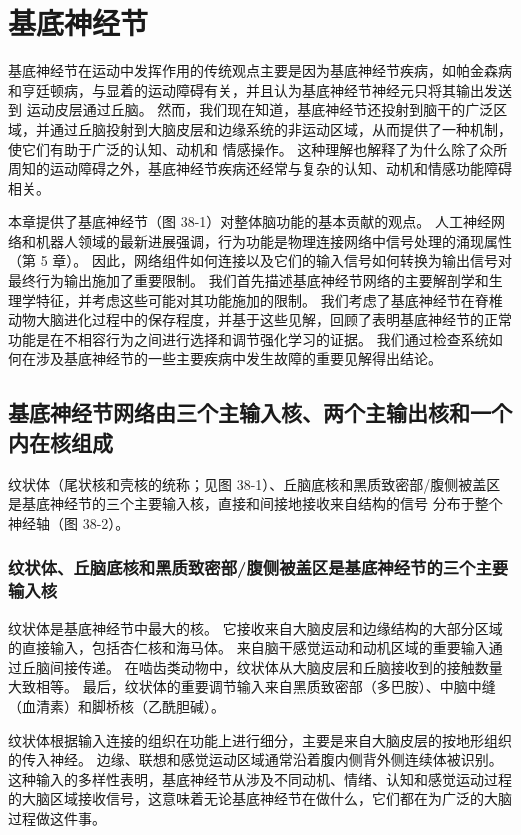 \chapter{基底神经节}

基底神经节在运动中发挥作用的传统观点主要是因为基底神经节疾病，如帕金森病和亨廷顿病，与显着的运动障碍有关，并且认为基底神经节神经元只将其输出发送到 运动皮层通过丘脑。 然而，我们现在知道，基底神经节还投射到脑干的广泛区域，并通过丘脑投射到大脑皮层和边缘系统的非运动区域，从而提供了一种机制，使它们有助于广泛的认知、动机和 情感操作。 这种理解也解释了为什么除了众所周知的运动障碍之外，基底神经节疾病还经常与复杂的认知、动机和情感功能障碍相关。

本章提供了基底神经节（图 38-1）对整体脑功能的基本贡献的观点。 人工神经网络和机器人领域的最新进展强调，行为功能是物理连接网络中信号处理的涌现属性（第 5 章）。 因此，网络组件如何连接以及它们的输入信号如何转换为输出信号对最终行为输出施加了重要限制。 我们首先描述基底神经节网络的主要解剖学和生理学特征，并考虑这些可能对其功能施加的限制。 我们考虑了基底神经节在脊椎动物大脑进化过程中的保存程度，并基于这些见解，回顾了表明基底神经节的正常功能是在不相容行为之间进行选择和调节强化学习的证据。 我们通过检查系统如何在涉及基底神经节的一些主要疾病中发生故障的重要见解得出结论。

\section{基底神经节网络由三个主输入核、两个主输出核和一个内在核组成}
纹状体（尾状核和壳核的统称；见图 38-1）、丘脑底核和黑质致密部/腹侧被盖区是基底神经节的三个主要输入核，直接和间接地接收来自结构的信号 分布于整个神经轴（图 38-2）。

\subsection{纹状体、丘脑底核和黑质致密部/腹侧被盖区是基底神经节的三个主要输入核}
纹状体是基底神经节中最大的核。 它接收来自大脑皮层和边缘结构的大部分区域的直接输入，包括杏仁核和海马体。 来自脑干感觉运动和动机区域的重要输入通过丘脑间接传递。 在啮齿类动物中，纹状体从大脑皮层和丘脑接收到的接触数量大致相等。 最后，纹状体的重要调节输入来自黑质致密部（多巴胺）、中脑中缝（血清素）和脚桥核（乙酰胆碱）。

纹状体根据输入连接的组织在功能上进行细分，主要是来自大脑皮层的按地形组织的传入神经。 边缘、联想和感觉运动区域通常沿着腹内侧背外侧连续体被识别。 这种输入的多样性表明，基底神经节从涉及不同动机、情绪、认知和感觉运动过程的大脑区域接收信号，这意味着无论基底神经节在做什么，它们都在为广泛的大脑过程做这件事。

